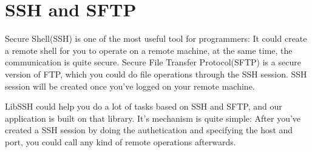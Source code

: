 
\section{SSH and SFTP}

Secure Shell(SSH) is one of the most useful tool for programmers: It could create a remote shell for you to operate on a remote machine, at the same time, the communication is quite secure. Secure File Transfer Protocol(SFTP) is a secure version of FTP, which you could do file operations through the SSH session. SSH session will be created once you've logged on your remote machine.

LibSSH could help you do a lot of tasks based on SSH and SFTP, and our application is built on that library. It's mechanism is quite simple: After you've created a SSH session by doing the authetication and specifying the host and port, you could call any kind of remote operations afterwards.

